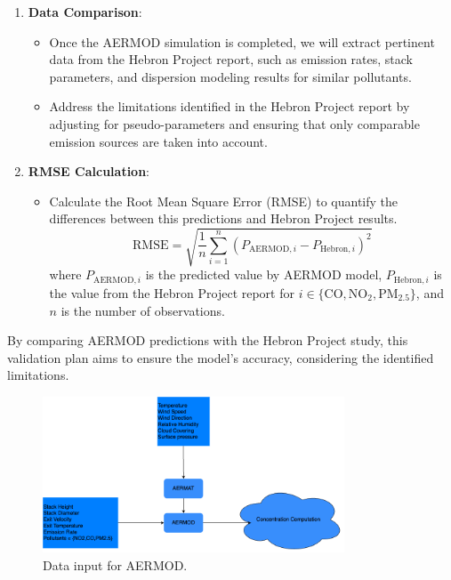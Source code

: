 \begin{enumerate}
    \item \textbf{Data Comparison}:
    \begin{itemize}
        \item Once the AERMOD simulation is completed, we  will extract pertinent data from the Hebron Project report, such as emission rates, stack parameters, and dispersion modeling results for similar pollutants.
        \item Address the limitations identified in the Hebron Project report by adjusting for pseudo-parameters and ensuring that only comparable emission sources are taken into account.
    \end{itemize}
    
    \item \textbf{RMSE Calculation}:
    \begin{itemize}
        \item Calculate the Root Mean Square Error (RMSE) to quantify the differences between this predictions and Hebron Project results.
        \[
        \text{RMSE} = \sqrt{\frac{1}{n} \sum_{i=1}^{n} (P_{\text{AERMOD},i} - P_{\text{Hebron},i})^2}
        \]
        where \( P_{\text{AERMOD},i} \) is the predicted value by AERMOD model, \( P_{\text{Hebron},i} \) is the value from the Hebron Project report for \(i \in \{\text{CO}, \text{NO}_2, \text{PM}_{2.5}\}\), and \( n \) is the number of observations.
    \end{itemize}
\end{enumerate}
By comparing AERMOD predictions with the Hebron Project study, this validation plan aims to ensure the model's accuracy, considering the identified limitations. 


\begin{figure}[h]
    \centering
    \includegraphics[width=0.8\textwidth]{./assets/flow_chart.png}
    \caption{Data input for AERMOD.}
    \label{data-input-aermod}
\end{figure}
    